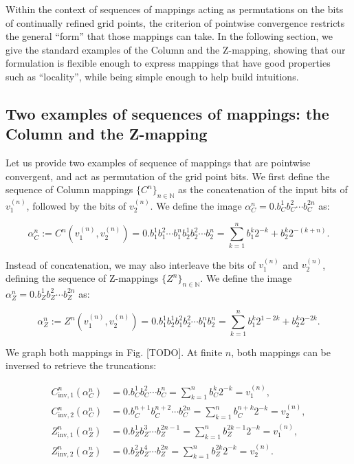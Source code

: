 \documentclass[10pt,letterpaper]{article}
\begin{document}
Within the context of sequences of mappings acting as permutations on the bits of continually refined grid points, the criterion of pointwise convergence restricts the general ``form'' that those mappings can take.
In the following section, we give the standard examples of the Column and the Z-mapping, showing that our formulation is flexible enough to express mappings that have good properties such as ``locality'', while being simple enough to help build intuitions.


\subsection{Two examples of sequences of mappings: the Column and the Z-mapping} \label{sec:mapping-examples}

Let us provide two examples of sequence of mappings that are pointwise convergent, and act as permutation of the grid point bits.
We first define the sequence of Column mappings $\{C^n\}_{n\in\mathbb N}$ as the concatenation of the input bits of $v_1^{(n)}$, followed by the bits of $v_2^{(n)}$. We define the image $\alpha_C^n = 0.b_C^1 b_C^2 \cdots b_C^{2n}$ as:

\begin{equation} \label{eq:def-column-mapping}
\alpha_C^n := C^n(v_1^{(n)}, v_2^{(n)}) = 0.b_1^1 b_1^2 \cdots b_1^n b_2^1 b_2^2 \cdots b_2^n = \sum_{k=1}^n b_1^k 2^{-k} + b_2^k 2^{-(k+n)}.
\end{equation}

Instead of concatenation, we may also interleave the bits of $v_1^{(n)}$ and $v_2^{(n)}$, defining the sequence of Z-mappings $\{Z^n\}_{n\in\mathbb N}$. We define the image $\alpha_Z^n = 0.b_Z^1 b_Z^2 \cdots b_Z^{2n}$ as:

\begin{equation} \label{eq:def-z-mapping}
\alpha_Z^n := Z^n(v_1^{(n)}, v_2^{(n)}) = 0.b_1^1 b_2^1 b_1^2 b_2^2 \cdots b_1^n b_2^n = \sum_{k=1}^n b_1^k 2^{1-2k} + b_2^k 2^{-2k}.
\end{equation}

We graph both mappings in Fig. [TODO]. At finite $n$, both mappings can be inversed to retrieve the truncations:

\begin{equation} \begin{aligned}
C^n_{\textrm{inv},1}(\alpha_C^n) &= 0.b_C^1 b_C^2 \cdots b_C^n = \sum_{k=1}^n b_C^k 2^{-k} = v_1^{(n)}, \\
C^n_{\textrm{inv},2}(\alpha_C^n) &= 0.b_C^{n+1} b_C^{n+2} \cdots b_C^{2n} = \sum_{k=1}^n b_C^{n+k} 2^{-k} = v_2^{(n)}, \\
Z^n_{\textrm{inv},1}(\alpha_Z^n) &= 0.b_Z^1 b_Z^3 \cdots b_Z^{2n-1} = \sum_{k=1}^n b_Z^{2k-1} 2^{-k} = v_1^{(n)},\\
Z^n_{\textrm{inv},2}(\alpha_Z^n) &= 0.b_Z^2 b_Z^4 \cdots b_Z^{2n} = \sum_{k=1}^n b_Z^{2k} 2^{-k} = v_2^{(n)}.
\end{aligned} \end{equation}
\end{document}
